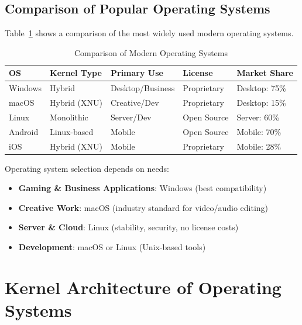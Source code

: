 \subsection{Comparison of Popular Operating Systems}

Table~\ref{tab:os-comparison} shows a comparison of the most widely used modern operating systems.

\begin{table}[htbp]
    \centering
    \caption{Comparison of Modern Operating Systems}
    \label{tab:os-comparison}
    \begin{tabular}{@{}lllll@{}}
        \toprule
        \textbf{OS} & \textbf{Kernel Type} & \textbf{Primary Use} & \textbf{License} & \textbf{Market Share} \\
        \midrule
        Windows & Hybrid & Desktop/Business & Proprietary & Desktop: 75\% \\
        macOS & Hybrid (XNU) & Creative/Dev & Proprietary & Desktop: 15\% \\
        Linux & Monolithic & Server/Dev & Open Source & Server: 60\% \\
        Android & Linux-based & Mobile & Open Source & Mobile: 70\% \\
        iOS & Hybrid (XNU) & Mobile & Proprietary & Mobile: 28\% \\
        \bottomrule
    \end{tabular}
\end{table}

\begin{tipbox}
Operating system selection depends on needs:
\begin{itemize}
    \item \textbf{Gaming \& Business Applications}: Windows (best compatibility)
    \item \textbf{Creative Work}: macOS (industry standard for video/audio editing)
    \item \textbf{Server \& Cloud}: Linux (stability, security, no license costs)
    \item \textbf{Development}: macOS or Linux (Unix-based tools)
\end{itemize}
\end{tipbox}

\section{Kernel Architecture of Operating Systems}
\label{sec:kernel-architecture}

